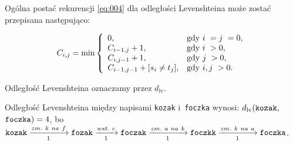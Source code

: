 \documentclass{praca1}
\begin{document}
\begin{definition}
Ogólna postać rekurencji \eqref{eq:004} dla odległości Levenshteina może zostać przepisana następująco:

\begin{equation}
\label{eq:006}
C_{i,j} = \min\left\{
\begin{array}{l l}     
    0, & \text{gdy } i~= j~= 0,\\
    C_{i-1, j} + 1, & \text{gdy } i~> 0, \\
    C_{i, j-1} + 1, & \text{gdy } j~> 0, \\
    C_{i-1, j-1} + [s_{i}\neq t_{j}], & \text{gdy } i, j~> 0.
\end{array}\right.
\end{equation}

Odległość Levenshteina oznaczamy przez $d_{\mathrm{lv}}$.
\end{definition}



\begin{example}
Odległość Levenshteina między napisami \verb|kozak| i~\verb|foczka| wynosi: $d_{\mathrm{lv}}(\verb|kozak|,$ $\verb|foczka|) = 4$, bo~$\verb|kozak| \xrightarrow[1]{zm.\ k\ na\ f} \verb|fozak|  \xrightarrow[1]{wst.\ c} \verb|foczak| \xrightarrow[1]{zm.\ a\ na\ k} \verb|foczkk| \xrightarrow[1]{zm.\ k\ na\ a} \verb|foczka|$.
\end{example}
\end{document}
